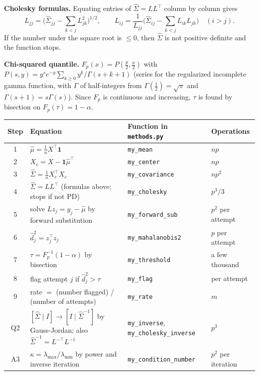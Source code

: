 \documentclass[11pt]{article}
\newcommand{\one}{\mathbf{1}}
\newcommand{\T}{^{\top}}
\newcommand{\hSigma}{\hat{\Sigma}}
\newcommand{\hmu}{\hat{\mu}}
\newcommand{\code}[1]{\texttt{#1}}
\theoremstyle{plain}
\begin{document}
\textbf{Cholesky formulas.} Equating entries of $\hSigma=LL\T$ column by column gives
\[
L_{jj}=\Big(\hSigma_{jj}-\sum_{k<j}L_{jk}^2\Big)^{1/2},\qquad
L_{ij}=\frac{1}{L_{jj}}\Big(\hSigma_{ij}-\sum_{k<j}L_{ik}L_{jk}\Big)\quad(i>j).
\]
If the number under the square root is $\le0$, then $\hSigma$ is not positive definite
and the function stops.

\textbf{Chi-squared quantile.} $F_p(x)=P(\tfrac p2,\tfrac x2)$ with
$P(s,y)=y^se^{-y}\sum_{k\ge0}y^k/\Gamma(s+k+1)$ (series for the regularized incomplete
gamma function, with $\Gamma$ of half-integers from $\Gamma(\tfrac12)=\sqrt\pi$ and
$\Gamma(s+1)=s\Gamma(s)$). Since $F_p$ is continuous and increasing, $\tau$ is found by
bisection on $F_p(\tau)=1-\alpha$.

\begin{table}[H]
\centering\small
\begin{tabularx}{\linewidth}{@{}c>{\raggedright\arraybackslash}X>{\raggedright\arraybackslash}p{3.6cm}>{\raggedright\arraybackslash}p{2.6cm}@{}}
\toprule
Step & Equation & Function in \code{methods.py} & Operations\\
\midrule
1 & $\hmu=\frac1nX\T\one$ & \code{my\_mean} & $np$\\
2 & $X_c=X-\one\hmu\T$ & \code{my\_center} & $np$\\
3 & $\hSigma=\frac1nX_c\T X_c$ & \code{my\_covariance} & $np^2$\\
4 & $\hSigma=LL\T$ (formulas above; stops if not PD) & \code{my\_cholesky} & $p^3/3$\\
5 & solve $Lz_j=y_j-\hmu$ by forward substitution & \code{my\_forward\_sub} & $p^2$ per attempt\\
6 & $\hat d_j^2=z_j\T z_j$ & \code{my\_mahalanobis2} & $p$ per attempt\\
7 & $\tau=F_p^{-1}(1-\alpha)$ by bisection & \code{my\_threshold} & a few thousand\\
8 & flag attempt $j$ if $\hat d_j^2>\tau$ & \code{my\_flag} & 1 per attempt\\
9 & rate $=$ (number flagged) / (number of attempts) & \code{my\_rate} & $m$\\
\midrule
Q2 & $[\hSigma\mid I]\to[I\mid\hSigma^{-1}]$ by Gauss-Jordan; also $\hSigma^{-1}=L^{-\top}L^{-1}$ & \code{my\_inverse}, \code{my\_cholesky\_inverse} & $p^3$\\
A3 & $\kappa=\lambda_{\max}/\lambda_{\min}$ by power and inverse iteration & \code{my\_condition\_number} & $p^2$ per iteration\\
\bottomrule
\end{tabularx}
\end{table}
\end{document}
